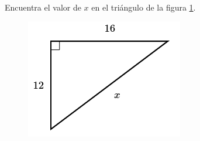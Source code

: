 Encuentra el valor de $x$ en el triángulo de la figura \ref{fig:lados_pitagoras_05}.

\begin{minipage}[t][][t]{0.35\textwidth}
    \begin{figure}[H]
        \centering
        \includegraphics[width=0.9\linewidth]{../images/lados_pitagoras_05.png}

        \caption{}
        \label{fig:lados_pitagoras_05}
    \end{figure}
\end{minipage}\hfill
\begin{minipage}[t][][t]{0.6\textwidth}
    \begin{solutionbox}{8cm}

    \end{solutionbox}
\end{minipage}
